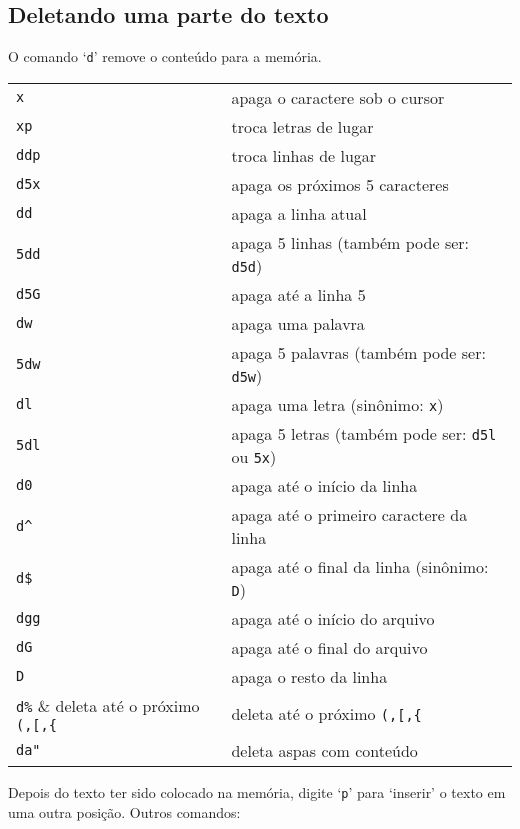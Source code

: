 \subsection{Deletando uma parte do texto}\label{Deletando uma parte do texto}

O comando `{\tt d}' remove o conteúdo para a memória.
\begin{table}[htb]\begin{center} \begin{tabular}{ll} \hline
    \verb|x| & apaga o caractere sob o cursor \\
    \verb|xp| & troca letras de lugar \\
     \verb|ddp| & troca linhas de lugar \\
     \verb|d5x| & apaga os próximos 5 caracteres \\
     \verb|dd| & apaga a linha atual \\
     \verb|5dd| & apaga 5 linhas (também pode ser: \verb|d5d|) \\
     \verb|d5G| & apaga até a linha 5 \\
     \verb|dw|  & apaga uma palavra \\
     \verb|5dw| & apaga 5 palavras (também pode ser: \verb|d5w|) \\
     \verb|dl|  & apaga uma letra (sinônimo: \verb|x|) \\
     \verb|5dl| & apaga 5 letras (também pode ser: \verb|d5l| ou \verb|5x|) \\
     \verb|d0|  & apaga até o início da linha \\
     \verb|d^|  & apaga até o primeiro caractere da linha \\
     \verb|d$|  & apaga até o final da linha (sinônimo: \verb|D|) \\
     \verb|dgg| & apaga até o início do arquivo \\
     \verb|dG|  & apaga até o final do arquivo \\
     \verb|D| & apaga o resto da linha \\
     \verb|d%| & deleta até o próximo \verb|(,[,{| \\
     \verb|da"| & deleta aspas com conteúdo \\
\hline \end{tabular}\end{center}\end{table}

Depois do texto ter sido colocado na memória, digite `{\tt p}' para `inserir' o
texto em uma outra posição. Outros comandos:

